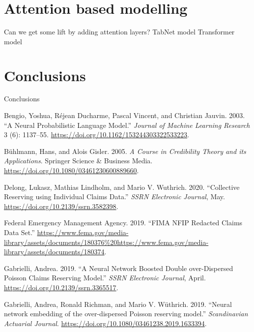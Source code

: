 \documentclass{article}
\newlength{\cslhangindent}
\newenvironment{cslreferences}%
  {\setlength{\parindent}{0pt}%
  \everypar{\setlength{\hangindent}{\cslhangindent}}\ignorespaces}%
  {\par}
\begin{document}
\hypertarget{attention-based-modelling}{%
\section{Attention based modelling}\label{attention-based-modelling}}

Can we get some lift by adding attention layers? TabNet model
Transformer model

\hypertarget{Conclusions}{%
\section{Conclusions}\label{Conclusions}}

Conclusions

\hypertarget{refs}{}
\begin{cslreferences}
\leavevmode\hypertarget{ref-Bengio2003}{}%
Bengio, Yoshua, Réjean Ducharme, Pascal Vincent, and Christian Jauvin.
2003. ``A Neural Probabilistic Language Model.'' \emph{Journal of
Machine Learning Research} 3 (6): 1137--55.
\url{https://doi.org/10.1162/153244303322533223}.

\leavevmode\hypertarget{ref-Buhlmann2006}{}%
Bühlmann, Hans, and Alois Gisler. 2005. \emph{A Course in Credibility
Theory and its Applications}. Springer Science \& Business Media.
\url{https://doi.org/10.1080/03461230600889660}.

\leavevmode\hypertarget{ref-Delong2020a}{}%
Delong, Lukasz, Mathias Lindholm, and Mario V. Wuthrich. 2020.
``Collective Reserving using Individual Claims Data.'' \emph{SSRN
Electronic Journal}, May. \url{https://doi.org/10.2139/ssrn.3582398}.

\leavevmode\hypertarget{ref-FederalEmergencyManagementAgency2019}{}%
Federal Emergency Management Agency. 2019. ``FIMA NFIP Redacted Claims
Data Set.''
\url{https://www.fema.gov/media-library/assets/documents/180376\%20https://www.fema.gov/media-library/assets/documents/180374}.

\leavevmode\hypertarget{ref-Gabrielli2019c}{}%
Gabrielli, Andrea. 2019. ``A Neural Network Boosted Double
over-Dispersed Poisson Claims Reserving Model.'' \emph{SSRN Electronic
Journal}, April. \url{https://doi.org/10.2139/ssrn.3365517}.

\leavevmode\hypertarget{ref-Gabrielli2019}{}%
Gabrielli, Andrea, Ronald Richman, and Mario V. Wüthrich. 2019. ``Neural
network embedding of the over-dispersed Poisson reserving model.''
\emph{Scandinavian Actuarial Journal}.
\url{https://doi.org/10.1080/03461238.2019.1633394}.


\end{cslreferences}
\end{document}
